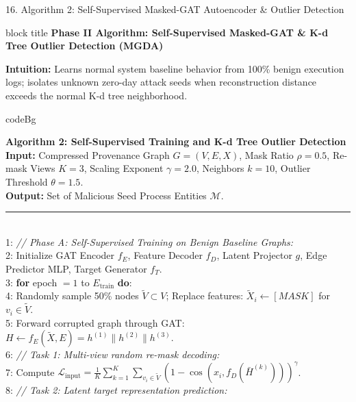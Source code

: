 \documentclass[aspectratio=169,10pt]{beamer}
\begin{document}
\begin{frame}{16. Algorithm 2: Self-Supervised Masked-GAT Autoencoder \& Outlier Detection}
\vspace{-0.30em}
\begin{beamercolorbox}[rounded=true,shadow=false,sep=0.25em,wd=\textwidth]{block title}
\textbf{\scriptsize Phase II Algorithm: Self-Supervised Masked-GAT \& K-d Tree Outlier Detection (MGDA)}
\end{beamercolorbox}
\vspace{0.08em}
{\fontsize{6.0pt}{7.5pt}\selectfont
\textbf{Intuition:} Learns normal system baseline behavior from 100\% benign execution logs; isolates unknown zero-day attack seeds when reconstruction distance exceeds the normal K-d tree neighborhood.
}
\vspace{0.10em}
\centering
\begin{beamercolorbox}[rounded=true,shadow=false,sep=0.20em,wd=0.98\textwidth]{codeBg}
{\fontsize{4.8pt}{5.8pt}\selectfont\ttfamily
\textbf{Algorithm 2: Self-Supervised Training and K-d Tree Outlier Detection}\\
\textbf{Input:} Compressed Provenance Graph $G = (V, E, X)$, Mask Ratio $\rho=0.5$, Re-mask Views $K=3$, Scaling Exponent $\gamma=2.0$, Neighbors $k=10$, Outlier Threshold $\theta=1.5$.\\
\textbf{Output:} Set of Malicious Seed Process Entities $\mathcal{M}$.\\[0.03cm]
\rule{\linewidth}{0.3pt}\\[0.03cm]
1: \textit{// Phase A: Self-Supervised Training on Benign Baseline Graphs:}\\
2: Initialize GAT Encoder $f_E$, Feature Decoder $f_D$, Latent Projector $g$, Edge Predictor MLP, Target Generator $f_T$.\\
3: \textbf{for} epoch $= 1$ to $E_{\text{train}}$ \textbf{do}:\\
4: \quad Randomly sample 50\% nodes $\tilde{V} \subset V$; Replace features: $\tilde{X}_i \leftarrow [MASK]$ for $v_i \in \tilde{V}$.\\
5: \quad Forward corrupted graph through GAT: $H \leftarrow f_E(\tilde{X}, E) = h^{(1)} \parallel h^{(2)} \parallel h^{(3)}$.\\
6: \quad \textit{// Task 1: Multi-view random re-mask decoding:}\\
7: \quad Compute $\mathcal{L}_{\text{input}} = \frac{1}{K}\sum_{k=1}^K \sum_{v_i \in \tilde{V}} (1 - \cos(x_i, f_D(\bar{H}^{(k)})))^\gamma$.\\
8: \quad \textit{// Task 2: Latent target representation prediction:}\\
}
\end{beamercolorbox}
\end{frame}
\end{document}
